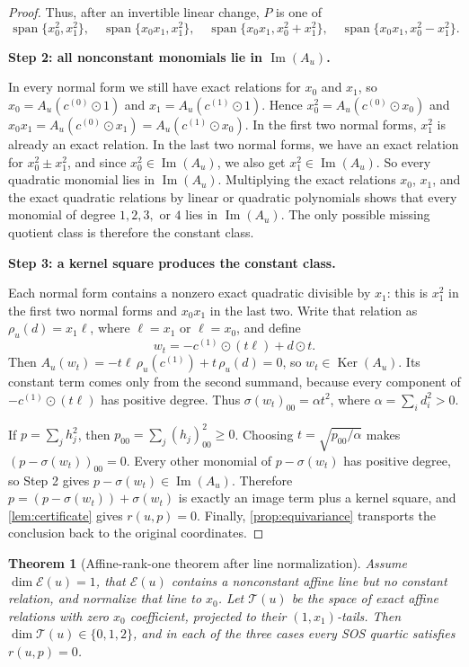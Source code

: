 \documentclass[10pt]{article}
\newtheorem{theorem}{Theorem}[section]
\theoremstyle{definition}
\DeclareMathOperator{\mspan}{span}
\DeclareMathOperator{\imag}{Im}
\DeclareMathOperator{\kernel}{Ker}
\newcommand{\Span}{\mspan}
\newcommand{\im}{\imag}
\newcommand{\Ker}{\kernel}
\newcommand{\sig}{\sigma}
\newcommand{\rel}{\rho}
\newcommand{\Exact}{\mathcal{E}}
\newcommand{\Tail}{\mathcal{T}}
\begin{document}
\begin{proof}
Thus, after an invertible linear change, \(P\) is one of
\[
  \Span\{x_0^2,x_1^2\},\quad
  \Span\{x_0x_1,x_1^2\},\quad
  \Span\{x_0x_1,x_0^2+x_1^2\},\quad
  \Span\{x_0x_1,x_0^2-x_1^2\}.
\]

\smallskip
\noindent\textbf{Step 2: all nonconstant monomials lie in \(\im(A_u)\).}

In every normal form we still have exact relations for \(x_0\) and \(x_1\), so
\(x_0=A_u(c^{(0)}\odot 1)\) and \(x_1=A_u(c^{(1)}\odot 1)\). Hence
\(x_0^2=A_u(c^{(0)}\odot x_0)\) and
\(x_0x_1=A_u(c^{(0)}\odot x_1)=A_u(c^{(1)}\odot x_0)\). In the first two normal
forms, \(x_1^2\) is already an exact relation. In the last two normal forms, we
have an exact relation for \(x_0^2\pm x_1^2\), and since \(x_0^2\in \im(A_u)\),
we also get \(x_1^2\in \im(A_u)\). So every quadratic monomial lies in
\(\im(A_u)\). Multiplying the exact relations \(x_0\), \(x_1\), and the exact
quadratic relations by linear or quadratic polynomials shows that every
monomial of degree \(1,2,3,\) or \(4\) lies in \(\im(A_u)\). The only possible
missing quotient class is therefore the constant class.

\smallskip
\noindent\textbf{Step 3: a kernel square produces the constant class.}

Each normal form contains a nonzero exact quadratic divisible by \(x_1\): this
is \(x_1^2\) in the first two normal forms and \(x_0x_1\) in the last two.
Write that relation as \(\rel_u(d)=x_1\ell\), where \(\ell=x_1\) or
\(\ell=x_0\), and define
\[
  w_t=-c^{(1)}\odot (t\ell)+d\odot t.
\]
Then \(A_u(w_t)=-t\ell\,\rel_u(c^{(1)})+t\,\rel_u(d)=0\), so \(w_t\in \Ker(A_u)\).
Its constant term comes only from the second summand, because every component of
\(-c^{(1)}\odot (t\ell)\) has positive degree. Thus
\(\sig(w_t)_{00}=\alpha t^2\), where \(\alpha=\sum_i d_i^2>0\).

If \(p=\sum_j h_j^2\), then \(p_{00}=\sum_j (h_j)_{00}^2\ge 0\). Choosing
\(t=\sqrt{p_{00}/\alpha}\) makes \((p-\sig(w_t))_{00}=0\). Every other monomial
of \(p-\sig(w_t)\) has positive degree, so Step 2 gives
\(p-\sig(w_t)\in \im(A_u)\). Therefore
\(p=(p-\sig(w_t))+\sig(w_t)\) is exactly an image term plus a kernel square, and
\cref{lem:certificate} gives \(r(u,p)=0\). Finally,
\cref{prop:equivariance} transports the conclusion back to the original
coordinates.
\end{proof}

\begin{theorem}[Affine-rank-one theorem after line normalization]
\label{thm:affine-rank-one}
Assume \(\dim \Exact(u)=1\), that \(\Exact(u)\) contains a nonconstant affine
line but no constant relation, and normalize that line to \(x_0\). Let
\(\Tail(u)\) be the space of exact affine relations with zero \(x_0\)
coefficient, projected to their \((1,x_1)\)-tails. Then
\(\dim \Tail(u)\in \{0,1,2\}\), and in each of the three cases every SOS quartic
satisfies \(r(u,p)=0\).
\end{theorem}
\end{document}
